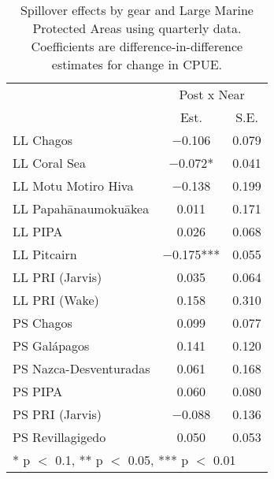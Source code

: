 \begin{table}

\caption{\label{tab:mpa_reg}Spillover effects by gear and Large Marine Protected Areas using quarterly data. Coefficients are
             difference-in-difference estimates for change in CPUE.}
\centering
\begin{tabular}[t]{lcc}
\toprule
\multicolumn{1}{c}{ } & \multicolumn{2}{c}{Post x Near} \\
\cmidrule(l{3pt}r{3pt}){2-3}
  & Est. & S.E.\\
\midrule
LL Chagos & \num{-0.106} & \num{0.079}\\
LL Coral Sea & \num{-0.072}* & \num{0.041}\\
LL Motu Motiro Hiva & \num{-0.138} & \num{0.199}\\
LL Papahānaumokuākea & \num{0.011} & \num{0.171}\\
LL PIPA & \num{0.026} & \num{0.068}\\
LL Pitcairn & \num{-0.175}*** & \num{0.055}\\
LL PRI (Jarvis) & \num{0.035} & \num{0.064}\\
LL PRI (Wake) & \num{0.158} & \num{0.310}\\
PS Chagos & \num{0.099} & \num{0.077}\\
PS Galápagos & \num{0.141} & \num{0.120}\\
PS Nazca-Desventuradas & \num{0.061} & \num{0.168}\\
PS PIPA & \num{0.060} & \num{0.080}\\
PS PRI (Jarvis) & \num{-0.088} & \num{0.136}\\
PS Revillagigedo & \num{0.050} & \num{0.053}\\
\bottomrule
\multicolumn{3}{l}{\rule{0pt}{1em}* p $<$ 0.1, ** p $<$ 0.05, *** p $<$ 0.01}\\
\end{tabular}
\end{table}
